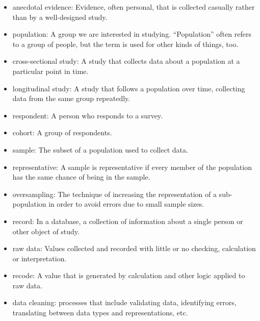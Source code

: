 \documentclass[12pt]{book}
\begin{document}
\begin{itemize}

\item anecdotal evidence: Evidence, often personal, that is collected
  casually rather than by a well-designed study.

\item population: A group we are interested in studying.
  ``Population'' often refers to a
  group of people, but the term is used for other kinds of things,
  too.

\item cross-sectional study: A study that collects data about a
population at a particular point in time.

\item longitudinal study: A study that follows a population over
time, collecting data from the same group repeatedly.

\item respondent: A person who responds to a survey.

\item cohort: A group of respondents.

\item sample: The subset of a population used to collect data.

\item representative: A sample is representative if every member
of the population has the same chance of being in the sample.

\item oversampling: The technique of increasing the representation
of a sub-population in order to avoid errors due to small sample
sizes.

\item record: In a database, a collection of information about
a single person or other object of study.

\item raw data: Values collected and recorded with little or no
checking, calculation or interpretation.

\item recode: A value that is generated by calculation and other
logic applied to raw data.

\item data cleaning: processes that include validating data, identifying
errors, translating between data types and representations, etc.

\end{itemize}
\end{document}
